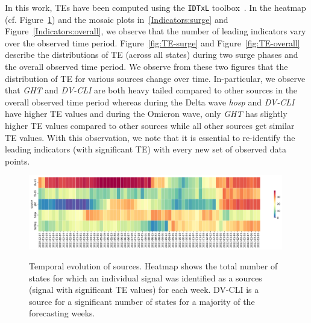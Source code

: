 \documentclass[conference,compsoc]{IEEEtran}
\begin{document}
In this work, TEs have been computed using the \verb|IDTxL| toolbox~\cite{wollstadt2018idtxl}. In the heatmap (cf. Figure~\ref{fig:averall_heatmap}) and the mosaic plots in~\ref{Indicators:surge} and Figure~\ref{Indicators:overall}, we observe that the number of leading indicators vary over the observed time period.
Figure~\ref{fig:TE-surge} and Figure~\ref{fig:TE-overall} describe the   distributions of TE (across all states)  during two surge phases and the overall observed time period. We observe from these two figures that the distribution of TE for various sources change over time. In-particular, we observe that \emph{GHT} and \emph{DV-CLI} are both heavy tailed compared to other sources in the overall observed time period whereas during the Delta wave \emph{hosp} and \emph{DV-CLI} have higher TE values and during the Omicron wave, only \emph{GHT} has slightly higher TE values compared to other sources while all other sources get similar TE values. With this observation, we note that it is essential to re-identify the leading indicators (with significant TE) with every new set of observed data points. 
\begin{figure}[!t]
    \centering
    \includegraphics[width=0.99\textwidth]{figs/cases_htmap_te_srcs_len_each_week.pdf}
     \label{fig:TE-surge}
     \caption{Temporal evolution of sources. Heatmap shows the total number of states for which an individual signal was identified as a sources (signal with significant TE values) for each week. DV-CLI is a source for a significant number of states for a majority of the forecasting weeks.}
     \label{fig:averall_heatmap}
\end{figure}
\end{document}
